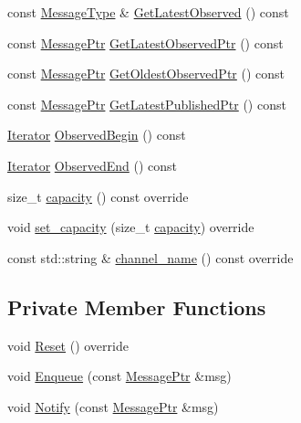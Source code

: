\begin{DoxyCompactItemize}
const \hyperlink{classapollo_1_1cyber_1_1blocker_1_1Blocker_ab6f5eb86a03109c66581e377a896650a}{Message\-Type} \& \hyperlink{classapollo_1_1cyber_1_1blocker_1_1Blocker_aa1afd44fb9b388c73c6aed51464dffe4}{Get\-Latest\-Observed} () const 
\item 
const \hyperlink{classapollo_1_1cyber_1_1blocker_1_1Blocker_acfdb26545f6e05820e043a22ed91ed1d}{Message\-Ptr} \hyperlink{classapollo_1_1cyber_1_1blocker_1_1Blocker_a14020fb49d3a2a52cf272ea2b7a4e971}{Get\-Latest\-Observed\-Ptr} () const 
\item 
const \hyperlink{classapollo_1_1cyber_1_1blocker_1_1Blocker_acfdb26545f6e05820e043a22ed91ed1d}{Message\-Ptr} \hyperlink{classapollo_1_1cyber_1_1blocker_1_1Blocker_a2ea6fb30c5190f2ed392bbe339ca7a9a}{Get\-Oldest\-Observed\-Ptr} () const 
\item 
const \hyperlink{classapollo_1_1cyber_1_1blocker_1_1Blocker_acfdb26545f6e05820e043a22ed91ed1d}{Message\-Ptr} \hyperlink{classapollo_1_1cyber_1_1blocker_1_1Blocker_ace2b23ef87620044f3931af23160f988}{Get\-Latest\-Published\-Ptr} () const 
\item 
\hyperlink{classapollo_1_1cyber_1_1blocker_1_1Blocker_a62c6fc3bb53c24ed9dd2bc69bdad7e3d}{Iterator} \hyperlink{classapollo_1_1cyber_1_1blocker_1_1Blocker_a679d0ffebcc4fa6f48c81f6c82f3ec92}{Observed\-Begin} () const 
\item 
\hyperlink{classapollo_1_1cyber_1_1blocker_1_1Blocker_a62c6fc3bb53c24ed9dd2bc69bdad7e3d}{Iterator} \hyperlink{classapollo_1_1cyber_1_1blocker_1_1Blocker_a91dea08c6179aa55994a7a842db100ef}{Observed\-End} () const 
\item 
size\-\_\-t \hyperlink{classapollo_1_1cyber_1_1blocker_1_1Blocker_a1560ce78043183df8b2d287cdc3824ed}{capacity} () const override
\item 
void \hyperlink{classapollo_1_1cyber_1_1blocker_1_1Blocker_ad2eef40f68908fc02c76be48cfc55b63}{set\-\_\-capacity} (size\-\_\-t \hyperlink{classapollo_1_1cyber_1_1blocker_1_1Blocker_a1560ce78043183df8b2d287cdc3824ed}{capacity}) override
\item 
const std\-::string \& \hyperlink{classapollo_1_1cyber_1_1blocker_1_1Blocker_ad121ab8e1fb379cd348267cccdc62624}{channel\-\_\-name} () const override
\end{DoxyCompactItemize}
\subsection*{Private Member Functions}
\begin{DoxyCompactItemize}
\item 
void \hyperlink{classapollo_1_1cyber_1_1blocker_1_1Blocker_a7372e1e554c724a5ca55de47837780da}{Reset} () override
\item 
void \hyperlink{classapollo_1_1cyber_1_1blocker_1_1Blocker_a2bb2d0e7cc2822d3898d9e374b54ee47}{Enqueue} (const \hyperlink{classapollo_1_1cyber_1_1blocker_1_1Blocker_acfdb26545f6e05820e043a22ed91ed1d}{Message\-Ptr} \&msg)
\item 
void \hyperlink{classapollo_1_1cyber_1_1blocker_1_1Blocker_a5c1c4c139f5ed9219ff22c9faf037944}{Notify} (const \hyperlink{classapollo_1_1cyber_1_1blocker_1_1Blocker_acfdb26545f6e05820e043a22ed91ed1d}{Message\-Ptr} \&msg)
\end{DoxyCompactItemize}
